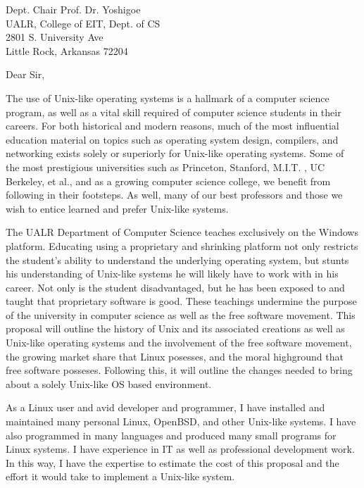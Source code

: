 \documentclass{letter}
\begin{document}
  \begin{letter}{
    Dept. Chair Prof. Dr. Yoshigoe \\
    UALR, College of EIT, Dept. of CS \\
    2801 S. University Ave \\
    Little Rock, Arkansas 72204
  }
    \opening{Dear Sir,}

    The use of Unix-like operating systems is a hallmark of a computer science program, as well as a vital skill required of computer science students in their careers. For both historical and modern reasons, much of the most influential education material on topics such as operating system design, compilers, and networking exists solely or superiorly for Unix-like operating systems. Some of the most prestigious universities such as Princeton, Stanford, M.I.T. \cite{MITLinux}, UC Berkeley, et al., and as a growing computer science college, we benefit from following in their footsteps. As well, many of our best professors and those we wish to entice learned and prefer Unix-like systems.

    The UALR Department of Computer Science teaches exclusively on the Windows platform. Educating using a proprietary and shrinking platform not only restricts the student's ability to understand the underlying operating system, but stunts his understanding of Unix-like systems he will likely have to work with in his career. Not only is the student disadvantaged, but he has been exposed to and taught that proprietary software is good. These teachings undermine the purpose of the university in computer science as well as the free software movement. This proposal will outline the history of Unix and its associated creations as well as Unix-like operating systems and the involvement of the free software movement, the growing market share that Linux posesses, and the moral highground that free software posseses. Following this, it will outline the changes needed to bring about a solely Unix-like OS based environment.

    As a Linux user and avid developer and programmer, I have installed and maintained many personal Linux, OpenBSD, and other Unix-like systems. I have also programmed in many languages and produced many small programs for Linux systems. I have experience in IT as well as professional development work. In this way, I have the expertise to estimate the cost of this proposal and the effort it would take to implement a Unix-like system.


\end{letter}
\end{document}
